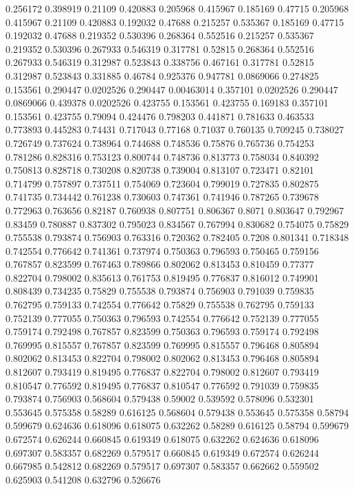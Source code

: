 0.256172 0.398919
0.21109 0.420883
0.205968 0.415967
0.185169 0.47715
0.205968 0.415967
0.21109 0.420883
0.192032 0.47688
0.215257 0.535367
0.185169 0.47715
0.192032 0.47688
0.219352 0.530396
0.268364 0.552516
0.215257 0.535367
0.219352 0.530396
0.267933 0.546319
0.317781 0.52815
0.268364 0.552516
0.267933 0.546319
0.312987 0.523843
0.338756 0.467161
0.317781 0.52815
0.312987 0.523843
0.331885 0.46784
0.925376 0.947781
0.0869066 0.274825
0.153561 0.290447
0.0202526 0.290447
0.00463014 0.357101
0.0202526 0.290447
0.0869066 0.439378
0.0202526 0.423755
0.153561 0.423755
0.169183 0.357101
0.153561 0.423755
0.79094 0.424476
0.798203 0.441871
0.781633 0.463533
0.773893 0.445283
0.74431 0.717043
0.77168 0.71037
0.760135 0.709245
0.738027 0.726749
0.737624 0.738964
0.744688 0.748536
0.75876 0.765736
0.754253 0.781286
0.828316 0.753123
0.800744 0.748736
0.813773 0.758034
0.840392 0.750813
0.828718 0.730208
0.820738 0.739004
0.813107 0.723471
0.82101 0.714799
0.757897 0.737511
0.754069 0.723604
0.799019 0.727835
0.802875 0.741735
0.734442 0.761238
0.730603 0.747361
0.741946 0.787265
0.739678 0.772963
0.763656 0.82187
0.760938 0.807751
0.806367 0.8071
0.803647 0.792967
0.83459 0.780887
0.837302 0.795023
0.834567 0.767994
0.830682 0.754075
0.75829 0.755538
0.793874 0.756903
0.763316 0.720362
0.782405 0.7208
0.801341 0.718348
0.742554 0.776642
0.741361 0.737974
0.750363 0.796593
0.750465 0.759156
0.767857 0.823599
0.767463 0.789866
0.802062 0.813453
0.810459 0.77377
0.822704 0.798002
0.835613 0.761753
0.819495 0.776837
0.816012 0.749901
0.808439 0.734235
0.75829 0.755538
0.793874 0.756903
0.791039 0.759835
0.762795 0.759133
0.742554 0.776642
0.75829 0.755538
0.762795 0.759133
0.752139 0.777055
0.750363 0.796593
0.742554 0.776642
0.752139 0.777055
0.759174 0.792498
0.767857 0.823599
0.750363 0.796593
0.759174 0.792498
0.769995 0.815557
0.767857 0.823599
0.769995 0.815557
0.796468 0.805894
0.802062 0.813453
0.822704 0.798002
0.802062 0.813453
0.796468 0.805894
0.812607 0.793419
0.819495 0.776837
0.822704 0.798002
0.812607 0.793419
0.810547 0.776592
0.819495 0.776837
0.810547 0.776592
0.791039 0.759835
0.793874 0.756903
0.568604 0.579438
0.59002 0.539592
0.578096 0.532301
0.553645 0.575358
0.58289 0.616125
0.568604 0.579438
0.553645 0.575358
0.58794 0.599679
0.624636 0.618096
0.618075 0.632262
0.58289 0.616125
0.58794 0.599679
0.672574 0.626244
0.660845 0.619349
0.618075 0.632262
0.624636 0.618096
0.697307 0.583357
0.682269 0.579517
0.660845 0.619349
0.672574 0.626244
0.667985 0.542812
0.682269 0.579517
0.697307 0.583357
0.662662 0.559502
0.625903 0.541208
0.632796 0.526676
